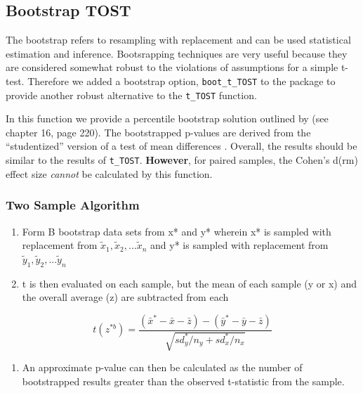 \documentclass[]{interact}
\theoremstyle{plain}%
\theoremstyle{definition}
\theoremstyle{remark}
\providecommand{\tightlist}{%
  \setlength{\itemsep}{0pt}\setlength{\parskip}{0pt}}
\def\tightlist{}
\begin{document}
\hypertarget{bootstrap-tost}{%
\subsection{Bootstrap TOST}\label{bootstrap-tost}}

The bootstrap refers to resampling with replacement and can be used
statistical estimation and inference. Bootsrapping techniques are very
useful because they are considered somewhat robust to the violations of
assumptions for a simple t-test. Therefore we added a bootstrap option,
\texttt{boot\_t\_TOST} to the package to provide another robust
alternative to the \texttt{t\_TOST} function.

In this function we provide a percentile bootstrap solution outlined by
\citet{efron93} (see chapter 16, page 220). The bootstrapped p-values
are derived from the ``studentized'' version of a test of mean
differences \citep{efron93}. Overall, the results should be similar to
the results of \texttt{t\_TOST}. \textbf{However}, for paired samples,
the Cohen's d(rm) effect size \emph{cannot} be calculated by this
function.

\hypertarget{two-sample-algorithm}{%
\subsubsection{Two Sample Algorithm}\label{two-sample-algorithm}}

\begin{enumerate}
\def\labelenumi{\arabic{enumi}.}
\item
  Form B bootstrap data sets from x* and y* wherein x* is sampled with
  replacement from \(\tilde x_1,\tilde x_2, ... \tilde x_n\) and y* is
  sampled with replacement from
  \(\tilde y_1,\tilde y_2, ... \tilde y_n\)
\item
  t is then evaluated on each sample, but the mean of each sample (y or
  x) and the overall average (z) are subtracted from each
\end{enumerate}

\[
t(z^{*b}) = \frac {(\bar x^*-\bar x - \bar z) - (\bar y^*-\bar y - \bar z)}{\sqrt {sd_y^*/n_y + sd_x^*/n_x}}
\]

\begin{enumerate}
\def\labelenumi{\arabic{enumi}.}
\setcounter{enumi}{2}
\tightlist
\item
  An approximate p-value can then be calculated as the number of
  bootstrapped results greater than the observed t-statistic from the
  sample.
\end{enumerate}
\end{document}
